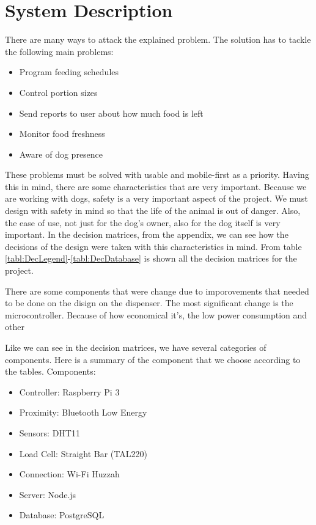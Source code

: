 \documentclass[12pt]{article}
\begin{document}
\section{System Description}

There are many ways to attack the explained problem. The solution has to tackle the following main problems:

\begin{itemize}
  \item Program feeding schedules
  \item Control portion sizes
  \item Send reports to user about how much food is left
  \item Monitor food freshness
  \item Aware of dog presence
\end{itemize}

These problems must be solved with usable and mobile-first as a priority. Having this in mind, there are some characteristics that are very important. Because we are working with dogs, safety is a very important aspect of the project. We must design with safety in mind so that the life of the animal is out of danger. Also, the ease of use, not just for the dog's owner, also for the dog itself is very important. In the decision matrices, from the appendix, we can see how the decisions of the design were taken with this characteristics in mind. From table \ref{tabl:DecLegend}-\ref{tabl:DecDatabase} is shown all the decision matrices for the project.

There are some components that were change due to imporovements that needed to be done on the disign on the dispenser. The most significant change is the microcontroller. Because of how economical it's, the low power consumption and other

Like we can see in the decision matrices, we have several categories of components. Here is a summary of the component that we choose according to the tables. Components:

\begin{itemize}
  \item Controller: Raspberry Pi 3
  \item Proximity: Bluetooth Low Energy
  \item Sensors: DHT11
  \item Load Cell: Straight Bar (TAL220)
  \item Connection: Wi-Fi Huzzah
  \item Server: Node.js
  \item Database: PostgreSQL
\end{itemize}
\end{document}

